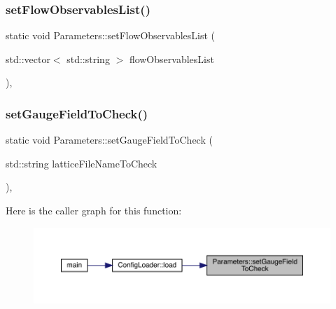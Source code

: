\subsubsection{\texorpdfstring{setFlowObservablesList()}{setFlowObservablesList()}}
{\footnotesize\ttfamily static void Parameters\+::set\+Flow\+Observables\+List (\begin{DoxyParamCaption}\item[{std\+::vector$<$ std\+::string $>$}]{flow\+Observables\+List }\end{DoxyParamCaption})\hspace{0.3cm}{\ttfamily [inline]}, {\ttfamily [static]}}

\mbox{\label{class_parameters_afba800600f057fa6ed8fb317add0af30}} 
\subsubsection{\texorpdfstring{setGaugeFieldToCheck()}{setGaugeFieldToCheck()}}
{\footnotesize\ttfamily static void Parameters\+::set\+Gauge\+Field\+To\+Check (\begin{DoxyParamCaption}\item[{std\+::string}]{lattice\+File\+Name\+To\+Check }\end{DoxyParamCaption})\hspace{0.3cm}{\ttfamily [inline]}, {\ttfamily [static]}}

Here is the caller graph for this function\+:
\nopagebreak
\begin{figure}[H]
\begin{center}
\leavevmode
\includegraphics[width=350pt]{class_parameters_afba800600f057fa6ed8fb317add0af30_icgraph}
\end{center}
\end{figure}
\mbox{\label{class_parameters_af4a107cdc7b6400685fdcbd33983a16f}} 
